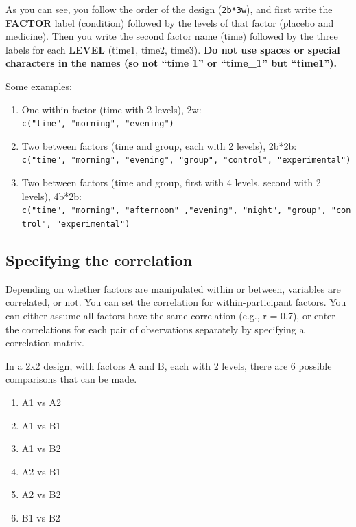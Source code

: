 \documentclass[
]{book}
\providecommand{\tightlist}{%
  \setlength{\itemsep}{0pt}\setlength{\parskip}{0pt}}
\begin{document}
As you can see, you follow the order of the design (\texttt{2b*3w}), and first write the \textbf{FACTOR} label (condition) followed by the levels of that factor (placebo and medicine). Then you write the second factor name (time) followed by the three labels for each \textbf{LEVEL} (time1, time2, time3). \textbf{Do not use spaces or special characters in the names (so not ``time 1'' or ``time\_1'' but ``time1'').}

Some examples:

\begin{enumerate}
\def\labelenumi{\arabic{enumi}.}
\tightlist
\item
  One within factor (time with 2 levels), 2w: \texttt{c("time",\ "morning",\ "evening")}
\item
  Two between factors (time and group, each with 2 levels), 2b*2b: \texttt{c("time",\ "morning",\ "evening",\ "group",\ "control",\ "experimental")}
\item
  Two between factors (time and group, first with 4 levels, second with 2 levels), 4b*2b: \texttt{c("time",\ "morning",\ "afternoon"\ ,"evening",\ "night",\ "group",\ "control",\ "experimental")}
\end{enumerate}

\hypertarget{specifying-the-correlation}{%
\subsection{Specifying the correlation}\label{specifying-the-correlation}}

Depending on whether factors are manipulated within or between, variables are correlated, or not. You can set the correlation for within-participant factors. You can either assume all factors have the same correlation (e.g., r = 0.7), or enter the correlations for each pair of observations separately by specifying a correlation matrix.

In a 2x2 design, with factors A and B, each with 2 levels, there are 6 possible comparisons that can be made.

\begin{enumerate}
\def\labelenumi{\arabic{enumi}.}
\tightlist
\item
  A1 vs A2
\item
  A1 vs B1
\item
  A1 vs B2
\item
  A2 vs B1
\item
  A2 vs B2
\item
  B1 vs B2
\end{enumerate}
\end{document}
